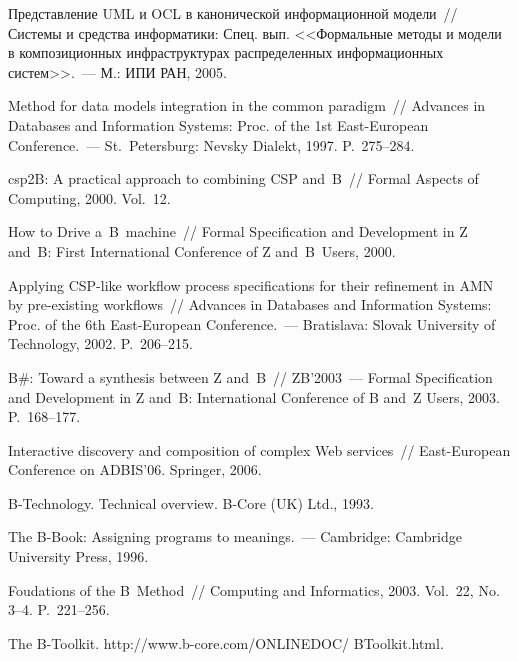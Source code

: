 \begin{multicols}{2}
{{\begin{thebibliography}{99}
Представление UML и OCL в канонической информационной модели~//
Системы и средства информатики: Спец. вып. <<Формальные методы и модели
в композиционных инфраструктурах распределенных информационных сис\-тем>>.~---
М.: ИПИ РАН, 2005.

Method for data models integration in the common paradigm~//
Advances in Databases and Information Systems:
Proc. of the 1st East-European Conference.~---
St.\ Petersburg: Nevsky Dialekt, 1997. P.~275--284.

csp2B: A practical approach to combining CSP and~B~//
Formal Aspects of Computing, 2000. Vol.~12.

How to Drive a~B~machine~// Formal Specification and Development in Z and~B:
First International Conference of Z and~B~Users, 2000.

Applying CSP-like workflow process specifications for their
refinement in AMN by pre-existing workflows~//
Advances in Databases and Information Systems:
Proc. of the 6th East-European Conference.~---
Bratislava: Slovak University of Technology, 2002. P.~206--215.

B\#: Toward a synthesis between Z and~B~//
ZB'2003~--- Formal Specification and Development in Z and~B:
International Conference of B and~Z Users,
2003. P.~168--177.

Interactive discovery
and composition of complex Web services~//
East-European Conference on ADBIS'06.
Springer, 2006.

 B-Technology. Technical overview. B-Core (UK) Ltd., 1993.

The B-Book: Assigning programs to meanings.~---
Cambridge: Cambridge University Press, 1996.

Foudations of the B~Method~// Computing and Informatics,
2003. Vol.~22, No.\,3--4. P.~221--256.

The B-Toolkit. {\sf http://www.b-core.com/ONLINEDOC/ BToolkit.html}.


\end{thebibliography}}}
\end{multicols}
